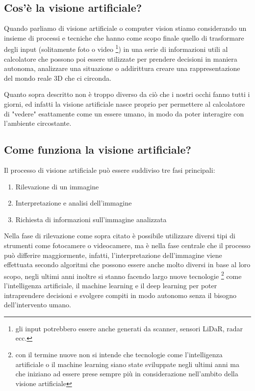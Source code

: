 \documentclass[12pt,a4paper,openright,twoside]{book}
\begin{document}
\subsection{Cos'è la visione artificiale?}
Quando parliamo di visione artificiale o computer vision stiamo considerando un insieme di processi e tecniche che hanno come scopo finale quello di trasformare degli input (solitamente foto o video \footnote{gli input potrebbero essere anche generati da scanner, sensori LiDaR, radar ecc.}) in una serie di informazioni utili al calcolatore che possono poi essere utilizzate per prendere decisioni in maniera autonoma, analizzare una situazione o addirittura creare una rappresentazione del mondo reale 3D che ci circonda. \cite{bradski2008learning} \cite{microsoftArtificialVision}

Quanto sopra descritto non è troppo diverso da ciò che i nostri occhi fanno tutti i giorni, ed infatti la visione artificiale nasce proprio per permettere al calcolatore di "vedere" esattamente come un essere umano, in modo da poter interagire con l'ambiente circostante.

\subsection{Come funziona la visione artificiale?}
Il processo di visione artificiale può essere suddiviso tre fasi principali:
\begin{enumerate}
	\item Rilevazione di un immagine
	\item Interpretazione e analisi dell'immagine
	\item Richiesta di informazioni sull'immagine analizzata
\end{enumerate}
Nella fase di rilevazione come sopra citato è possibile utilizzare diversi tipi di strumenti come fotocamere o videocamere, ma è nella fase centrale che il processo può differire maggiormente, infatti, l'interpretazione dell'immagine viene effettuata secondo algoritmi che possono essere anche molto diversi in base al loro scopo, negli ultimi anni inoltre si stanno facendo largo nuove tecnologie \footnote{con il termine nuove non si intende che tecnologie come l'intelligenza artificiale o il machine learning siano state sviluppate negli ultimi anni ma che iniziano ad essere prese sempre più in considerazione nell'ambito della visione artificiale} come l'intelligenza artificiale, il machine learning e il deep learning per poter intraprendere decisioni e svolgere compiti in modo autonomo senza il bisogno dell'intervento umano.
\end{document}
